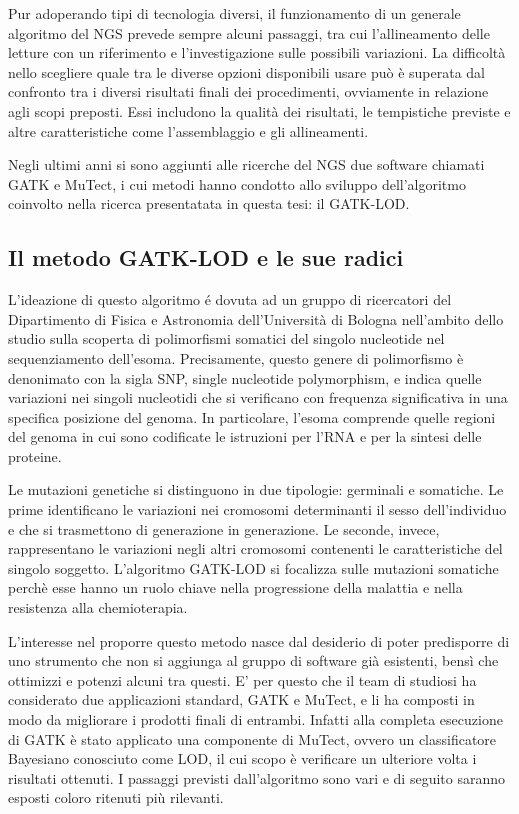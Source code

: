 Pur adoperando tipi di tecnologia diversi, il funzionamento di un generale algoritmo del NGS prevede sempre alcuni passaggi, tra cui l'allineamento delle letture con un riferimento e l'investigazione sulle possibili variazioni.
La difficoltà nello scegliere quale tra le diverse opzioni disponibili usare può è superata dal confronto tra i diversi risultati finali dei procedimenti, ovviamente in relazione agli scopi preposti. 
Essi includono la qualità dei risultati, le tempistiche previste e altre caratteristiche come l'assemblaggio e gli allineamenti.

Negli ultimi anni si sono aggiunti alle ricerche del NGS due software chiamati GATK e MuTect, i cui metodi hanno condotto allo sviluppo dell'algoritmo coinvolto nella ricerca presentatata in questa tesi: il GATK-LOD.


\subsection{Il metodo GATK-LOD e le sue radici}
L'ideazione di questo algoritmo é dovuta ad un gruppo di ricercatori del Dipartimento di Fisica e Astronomia dell'Università di Bologna nell'ambito dello studio sulla scoperta di polimorfismi somatici del singolo nucleotide nel sequenziamento dell'esoma.
Precisamente, questo genere di polimorfismo è denonimato con la sigla SNP, single nucleotide polymorphism, e indica quelle variazioni nei singoli nucleotidi che si verificano con frequenza significativa in una specifica posizione del genoma.
In particolare, l'esoma comprende quelle regioni del genoma in cui sono codificate le istruzioni per l'RNA e per la sintesi delle proteine.

Le mutazioni genetiche si distinguono in due tipologie: germinali e somatiche. Le prime identificano le variazioni nei cromosomi determinanti il sesso dell'individuo e che si trasmettono di generazione in generazione. Le seconde, invece, rappresentano le variazioni negli altri cromosomi contenenti le caratteristiche del singolo soggetto. 
L'algoritmo GATK-LOD si focalizza sulle mutazioni somatiche perchè esse hanno un ruolo chiave nella progressione della malattia e nella resistenza alla chemioterapia.

L'interesse nel proporre questo metodo nasce dal desiderio di poter predisporre di uno strumento che non si aggiunga al gruppo di software già esistenti, bensì che ottimizzi e potenzi alcuni tra questi.
E' per questo che il team di studiosi ha considerato due applicazioni standard, GATK e MuTect, e li ha composti in modo da migliorare i prodotti finali di entrambi.
Infatti alla completa esecuzione di GATK è stato applicato una componente di MuTect, ovvero un classificatore Bayesiano conosciuto come LOD, il cui scopo è verificare un ulteriore volta i risultati ottenuti.
I passaggi previsti dall'algoritmo sono vari e di seguito saranno esposti coloro ritenuti più rilevanti.

